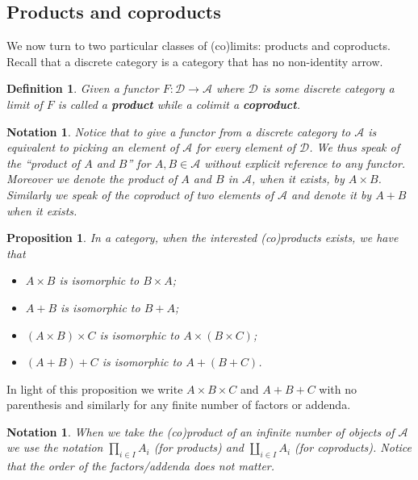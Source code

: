 \documentclass[letterpaper, 11pt, oneside]{memoir}
\theoremstyle{myteo}
\newtheorem{proposition}[theorem]{Proposition}
\newtheorem{definition}[theorem]{Definition}
\newtheorem{notation}[theorem]{Notation}
\numberwithin{equation}{section}
\newcommand{\marginnote}[1]{\marginpar{\footnotesize #1}}
\newcommand{\A}{\mathscr{A}}
\begin{document}
\subsection{Products and coproducts}

We now turn to two particular classes of (co)limits: products and coproducts.
Recall that a discrete category is a category that has no non-identity arrow.

\begin{definition}
  Given a functor \(F \colon \mathscr{D} \to \A\) where \(\mathscr{D}\) is some discrete category a limit of \(F\) is called a \textbf{product} while a colimit a \textbf{coproduct}.
  \marginnote{product, coproduct}
\end{definition}

\begin{notation}
  Notice that to give a functor from a discrete category to \(\A\) is equivalent to picking an element of \(\A\) for every element of \(\mathscr{D}\).
  We thus speak of the ``product of \(A\) and \(B\)'' for \(A, B \in \A\) without explicit reference to any functor.
  Moreover we denote the product of \(A\) and \(B\) in \(\A\), when it exists, by \(A \times B\).
  Similarly we speak of the coproduct of two elements of \(\A\) and denote it by \(A + B\) when it exists.
\end{notation}

\begin{proposition}
  In a category, when the interested (co)products exists, we have that
  \begin{itemize}
  \item[1.] \(A \times B\) is isomorphic to \(B \times A\);
  \item[2.] \(A + B\) is isomorphic to \(B + A\);
  \item[3.] \((A \times B) \times C\) is isomorphic to \(A \times (B \times C)\);
  \item[4.] \((A + B) + C\) is isomorphic to \(A + (B + C)\). 
  \end{itemize}
\end{proposition}

In light of this proposition we write \(A \times B \times C\) and \(A + B + C\) with no parenthesis and similarly for any finite number of factors or addenda.

\begin{notation}
  When we take the (co)product of an infinite number of objects of \(\A\) we use the notation \(\prod_{i\in I}A_i\) (for products) and \(\coprod_{i \in I}A_i\) (for coproducts).
  Notice that the order of the factors/addenda does not matter.
\end{notation}
\end{document}

